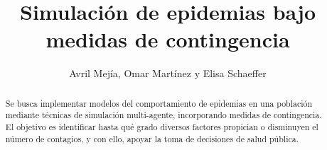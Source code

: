 \documentclass{sciposter}
\title{Simulación de epidemias bajo medidas de contingencia}
\author{Avril Mejía, Omar Martínez y Elisa Schaeffer}
\institute {Posgrado en Ingeniería de Sistemas}
\begin{document}

\maketitle
\begin{abstract}
Se busca implementar modelos del comportamiento de epidemias en una población mediante técnicas de simulación multi-agente, incorporando medidas de contingencia. El objetivo es identificar hasta qué grado diversos factores propician o disminuyen el número de contagios, y con ello, apoyar la toma de decisiones de salud pública.
\end{abstract}
\end{document}
